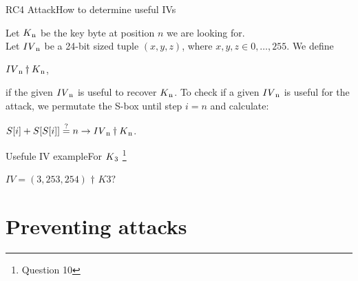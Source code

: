 \documentclass[
	aspectratio=169,	%
	onlytextwidth,		%
	t					%
	]{beamer}
\begin{document}
\begin{frame}[fragile]{RC4 Attack}{How to determine useful IVs}
	\begin{definition}
		Let $K\textsubscript{n}$ be the key byte at position $n$ we are looking for. \\
		Let $IV\textsubscript{n}$ be a 24-bit sized tuple $(x,y,z)$, where $x,y,z \in {0,\dots, 255}.$ We define\\
		\begin{center}$IV\textsubscript{n} \dagger K\textsubscript{n}$,
		\end{center}
		if the given $IV\textsubscript{n}$ is useful to recover $K\textsubscript{n}$.
		To check if a given $IV\textsubscript{n}$ is useful for the attack, we permutate the S-box until step $i=n$ and calculate:
		\begin{center}$S[i] + S[S[i]] \stackrel{?}{=} n \rightarrow IV\textsubscript{n} \dagger K\textsubscript{n}$.
		\end{center}
	\end{definition} 
\end{frame}

\begin{frame}[fragile]{Usefule IV example}{For $K\textsubscript{3}$ \footnote[frame]{\footnotesize Question 10}}
	\begin{itemize}
		$IV=(3,253,254)$ $\dagger$ $K3?$ 
	\end{itemize}
\end{frame}

\section{Preventing attacks}
\end{document}
